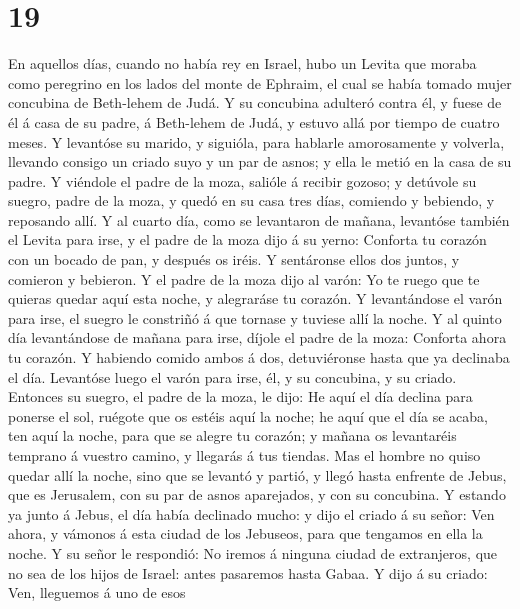\hypertarget{section-18}{%
\section{19}\label{section-18}}

 En aquellos días, cuando no había rey en Israel, hubo un
Levita que moraba como peregrino en los lados del monte de Ephraim, el
cual se había tomado mujer concubina de Beth-lehem de Judá. 
Y su concubina adulteró contra él, y fuese de él á casa de su padre, á
Beth-lehem de Judá, y estuvo allá por tiempo de cuatro meses.
 Y levantóse su marido, y siguióla, para hablarle
amorosamente y volverla, llevando consigo un criado suyo y un par de
asnos; y ella le metió en la casa de su padre.  Y viéndole
el padre de la moza, salióle á recibir gozoso; y detúvole su suegro,
padre de la moza, y quedó en su casa tres días, comiendo y bebiendo, y
reposando allí.  Y al cuarto día, como se levantaron de
mañana, levantóse también el Levita para irse, y el padre de la moza
dijo á su yerno: Conforta tu corazón con un bocado de pan, y después os
iréis.  Y sentáronse ellos dos juntos, y comieron y
bebieron. Y el padre de la moza dijo al varón: Yo te ruego que te
quieras quedar aquí esta noche, y alegraráse tu corazón.  Y
levantándose el varón para irse, el suegro le constriñó á que tornase y
tuviese allí la noche.  Y al quinto día levantándose de
mañana para irse, díjole el padre de la moza: Conforta ahora tu corazón.
Y habiendo comido ambos á dos, detuviéronse hasta que ya declinaba el
día.  Levantóse luego el varón para irse, él, y su
concubina, y su criado. Entonces su suegro, el padre de la moza, le
dijo: He aquí el día declina para ponerse el sol, ruégote que os estéis
aquí la noche; he aquí que el día se acaba, ten aquí la noche, para que
se alegre tu corazón; y mañana os levantaréis temprano á vuestro camino,
y llegarás á tus tiendas.  Mas el hombre no quiso quedar
allí la noche, sino que se levantó y partió, y llegó hasta enfrente de
Jebus, que es Jerusalem, con su par de asnos aparejados, y con su
concubina.  Y estando ya junto á Jebus, el día había
declinado mucho: y dijo el criado á su señor: Ven ahora, y vámonos á
esta ciudad de los Jebuseos, para que tengamos en ella la noche.
 Y su señor le respondió: No iremos á ninguna ciudad de
extranjeros, que no sea de los hijos de Israel: antes pasaremos hasta
Gabaa. Y dijo á su criado:  Ven, lleguemos á uno de esos
